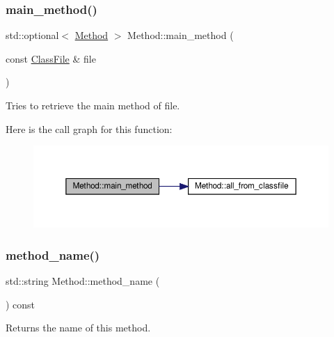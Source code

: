 \subsubsection{\texorpdfstring{main\+\_\+method()}{main\_method()}}
{\footnotesize\ttfamily std\+::optional$<$ \hyperlink{classMethod}{Method} $>$ Method\+::main\+\_\+method (\begin{DoxyParamCaption}\item[{const \hyperlink{classfile_8h_a00b46b60bc40e813e9fb1bb049174346}{Class\+File} \&}]{file }\end{DoxyParamCaption})\hspace{0.3cm}{\ttfamily [static]}}



Tries to retrieve the main method of {\ttfamily file}. 

Here is the call graph for this function\+:\nopagebreak
\begin{figure}[H]
\begin{center}
\leavevmode
\includegraphics[width=350pt]{classMethod_a74801df628f1be6e2c616cf5feb328b1_cgraph}
\end{center}
\end{figure}
\mbox{\label{classMethod_ab0855cbda89f070acc27ebff025ffd15}} 
\subsubsection{\texorpdfstring{method\+\_\+name()}{method\_name()}}
{\footnotesize\ttfamily std\+::string Method\+::method\+\_\+name (\begin{DoxyParamCaption}{ }\end{DoxyParamCaption}) const}



Returns the name of this method. 

